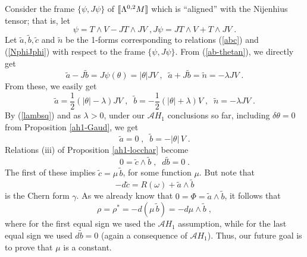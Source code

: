\documentclass{amsart}
\newcommand{\La}{\Lambda}
\newcommand{\leftr}{[\hbox{\hspace{-0.15em}}[}
\newcommand{\rightr}{]\hbox{\hspace{-0.15em}}]}
\begin{document}
Consider the frame $\{ \psi, J\psi \}$ of $\leftr \La^{0,2}M \rightr$ which is ``aligned'' with the Nijenhius tensor; that is, let 
\begin{equation} \label{psiJpsi}
\psi = T \wedge V - JT \wedge JV \; , J\psi = JT \wedge V + T \wedge JV \; .
\end{equation}
Let $\tilde{a}, \tilde{b}, \tilde{c} $ and $\tilde{n}$ be the 1-forms corresponding to relations (\ref{abc}) and (\ref{NphiJphi}) with respect to the frame $\{ \psi, J\psi \}$. From (\ref{ab-thetan}), we directly get
$$ \tilde{a} - J \tilde{b} = J\psi(\theta) = |\theta| JV \; , \; \; \tilde{a} + J \tilde{b} =  \tilde{n} = - \lambda JV \; .  $$
From these, we easily get
\begin{equation} \label{tatb}
\tilde{a} = \frac{1}{2} (|\theta| - \lambda) JV \; , \; \; \tilde{b} = - \frac{1}{2} (|\theta| + \lambda) V \; , \; \; \tilde{n} = - \lambda JV \; .   
\end{equation}
By (\ref{lambsq}) and as $\lambda >0$, under our ${\mathcal AH}_1$ conclusions so far, including $\delta \theta =0$ from Proposition \ref{ah1-Gaud}, we get
\begin{equation} \label{tatbah1}
\tilde{a} = 0 \; , \; \; \tilde{b} = - |\theta| \, V \; .   
\end{equation}
Relations (iii) of Proposition \ref{ah1-locchar}  become
$$ 0 = \tilde{c} \wedge \tilde{b} \; , \; \; d \tilde{b} = 0 \; . $$
The first of these implies $\tilde{c} = \mu \, \tilde{b} $, for some function $\mu$.
But note that 
$$- d \tilde{c}= R(\omega) +  \tilde{a} \wedge \tilde{b}$$
is the Chern form $\gamma$. As we already know that $0 =\Phi = \tilde{a} \wedge \tilde{b}$, it follows that
$$ \rho = \rho^* = -d(\mu \, \tilde{b} ) = - d \mu \wedge \tilde{b} \; ,$$
where for the first equal sign we used the ${\mathcal AH}_1$ assumption, while for the last equal sign we used $d \tilde{b} = 0$ (again a consequence of ${\mathcal AH}_1$). Thus, our future goal is to prove that $\mu$ is a constant.
\end{document}
